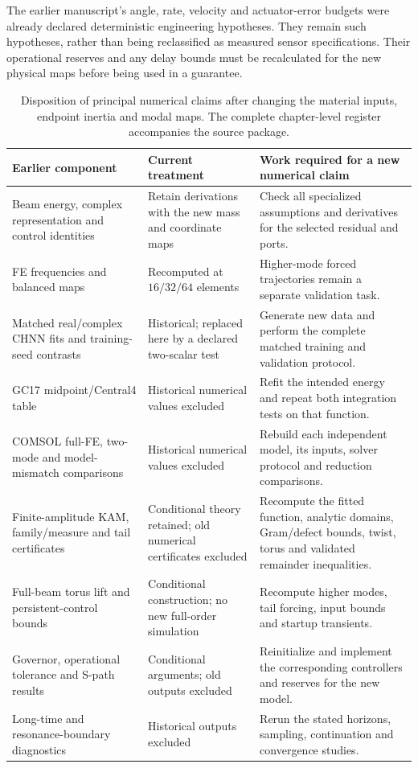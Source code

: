 The earlier manuscript's angle, rate, velocity and actuator-error
budgets were already declared deterministic engineering hypotheses.
They remain such hypotheses, rather than being reclassified as
measured sensor specifications. Their operational reserves and
any delay bounds must be recalculated for the new physical maps
before being used in a guarantee.

\begin{table}[t]
\centering
\caption{Disposition of principal numerical claims after changing
the material inputs, endpoint inertia and modal maps. The complete
chapter-level register accompanies the source package.}
\label{sx:migration-table}
\begin{tabular}{p{}p{}p{}}
\toprule
Earlier component & Current treatment & Work required for a new numerical claim\\
\midrule
Beam energy, complex representation and control identities & Retain derivations with the new mass and coordinate maps & Check all specialized assumptions and derivatives for the selected residual and ports.\\
FE frequencies and balanced maps & Recomputed at $16/32/64$ elements & Higher-mode forced trajectories remain a separate validation task.\\
Matched real/complex CHNN fits and training-seed contrasts & Historical; replaced here by a declared two-scalar test & Generate new data and perform the complete matched training and validation protocol.\\
GC17 midpoint/Central4 table & Historical numerical values excluded & Refit the intended energy and repeat both integration tests on that function.\\
COMSOL full-FE, two-mode and model-mismatch comparisons & Historical numerical values excluded & Rebuild each independent model, its inputs, solver protocol and reduction comparisons.\\
Finite-amplitude KAM, family/measure and tail certificates & Conditional theory retained; old numerical certificates excluded & Recompute the fitted function, analytic domains, Gram/defect bounds, twist, torus and validated remainder inequalities.\\
Full-beam torus lift and persistent-control bounds & Conditional construction; no new full-order simulation & Recompute higher modes, tail forcing, input bounds and startup transients.\\
Governor, operational tolerance and S-path results & Conditional arguments; old outputs excluded & Reinitialize and implement the corresponding controllers and reserves for the new model.\\
Long-time and resonance-boundary diagnostics & Historical outputs excluded & Rerun the stated horizons, sampling, continuation and convergence studies.\\
\bottomrule
\end{tabular}
\end{table}

